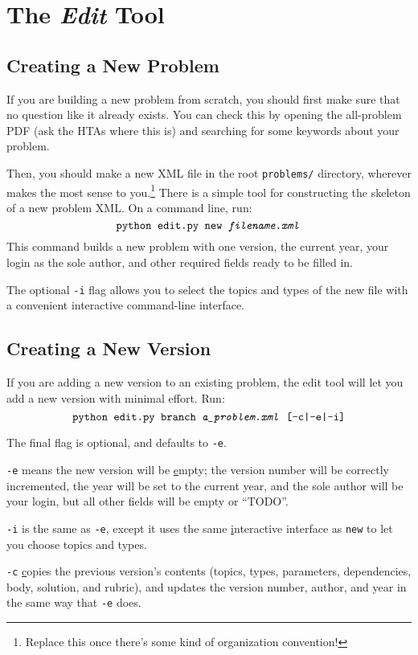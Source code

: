 \section{The \textit{Edit} Tool}
  \subsection{Creating a New Problem}
    If you are building a new problem from scratch, you should first make sure that no question like it already exists. You can check this by opening the all-problem PDF (ask the HTAs where this is) and searching for some keywords about your problem.
    
    Then, you should make a new XML file in the root \texttt{problems/} directory, wherever makes the most sense to you.\footnote{Replace this once there's some kind of organization convention!} There is a simple tool for constructing the skeleton of a new problem XML. On a command line, run: \[\texttt{python edit.py }\texttt{new \textit{filename.xml}}\] This command builds a new problem with one version, the current year, your login as the sole author, and other required fields ready to be filled in.
    
    The optional \texttt{-i} flag allows you to select the topics and types of the new file with a convenient interactive command-line interface. 
    
  \subsection{Creating a New Version}
    If you are adding a new version to an existing problem, the edit tool will let you add a new version with minimal effort. Run: \[\texttt{python edit.py }\texttt{branch \textit{a\_problem.xml} [-c|-e|-i]}\]
    
    The final flag is optional, and defaults to \texttt{-e}.
    
    \texttt{-e} means the new version will be \underline{e}mpty; the version number will be correctly incremented, the year will be set to the current year, and the sole author will be your login, but all other fields will be empty or ``TODO''.
    
    \texttt{-i} is the same as \texttt{-e}, except it uses the same \underline{i}nteractive interface as \pytool\texttt{new} to let you choose topics and types.
    
    \texttt{-c} \underline{c}opies the previous version's contents (topics, types, parameters, dependencies, body, solution, and rubric), and updates the version number, author, and year in the same way that \texttt{-e} does.
    
